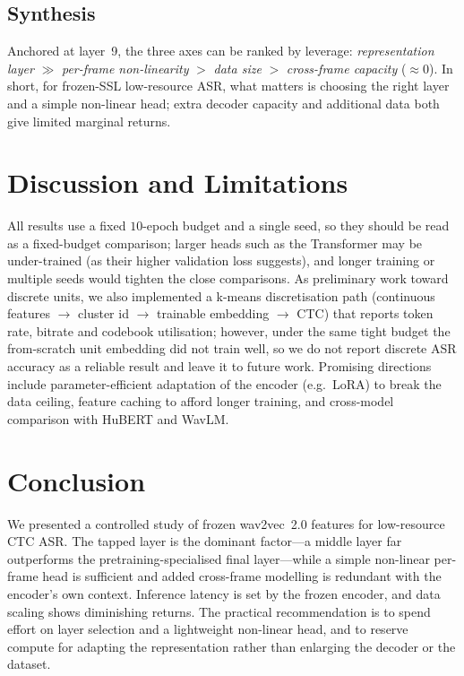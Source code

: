 \subsection{Synthesis}
Anchored at layer~9, the three axes can be ranked by leverage:
\emph{representation layer} $\gg$ \emph{per-frame non-linearity} $>$
\emph{data size} $>$ \emph{cross-frame capacity} ($\approx0$). In short, for
frozen-SSL low-resource ASR, what matters is choosing the right layer and a
simple non-linear head; extra decoder capacity and additional data both give
limited marginal returns.

\section{Discussion and Limitations}
\label{sec:disc}
All results use a fixed $10$-epoch budget and a single seed, so they should be
read as a fixed-budget comparison; larger heads such as the Transformer may be
under-trained (as their higher validation loss suggests), and longer training
or multiple seeds would tighten the close comparisons. As preliminary work
toward discrete units, we also implemented a k-means discretisation path
(continuous features $\rightarrow$ cluster id $\rightarrow$ trainable embedding
$\rightarrow$ CTC) that reports token rate, bitrate and codebook utilisation;
however, under the same tight budget the from-scratch unit embedding did not
train well, so we do not report discrete ASR accuracy as a reliable result and
leave it to future work. Promising directions include parameter-efficient
adaptation of the encoder (e.g.\ LoRA) to break the data ceiling, feature
caching to afford longer training, and cross-model comparison with HuBERT and
WavLM.

\section{Conclusion}
We presented a controlled study of frozen wav2vec~2.0 features for low-resource
CTC ASR. The tapped layer is the dominant factor---a middle layer far
outperforms the pretraining-specialised final layer---while a simple non-linear
per-frame head is sufficient and added cross-frame modelling is redundant with
the encoder's own context. Inference latency is set by the frozen encoder, and
data scaling shows diminishing returns. The practical recommendation is to
spend effort on layer selection and a lightweight non-linear head, and to
reserve compute for adapting the representation rather than enlarging the
decoder or the dataset.

